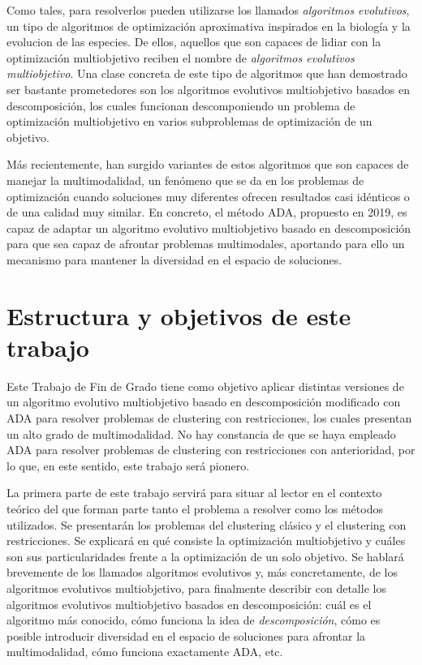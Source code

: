Como tales, para resolverlos pueden utilizarse los llamados \emph{algoritmos evolutivos}, un tipo de algoritmos de optimización aproximativa inspirados en la biología y la evolucion de las especies. De ellos, aquellos que son capaces de lidiar con la optimización multiobjetivo reciben el nombre de \emph{algoritmos evolutivos multiobjetivo}. Una clase concreta de este tipo de algoritmos que han demostrado ser bastante prometedores son los algoritmos evolutivos multiobjetivo basados en descomposición, los cuales funcionan descomponiendo un problema de optimización multiobjetivo en varios subproblemas de optimización de un objetivo.

Más recientemente, han surgido variantes de estos algoritmos que son capaces de manejar la multimodalidad, un fenómeno que se da en los problemas de optimización cuando soluciones muy diferentes ofrecen resultados casi idénticos o de una calidad muy similar. En concreto, el método ADA, propuesto en 2019, es capaz de adaptar un algoritmo evolutivo multiobjetivo basado en descomposición para que sea capaz de afrontar problemas multimodales, aportando para ello un mecanismo para mantener la diversidad en el espacio de soluciones.

\section{Estructura y objetivos de este trabajo}

Este Trabajo de Fin de Grado tiene como objetivo aplicar distintas versiones de un algoritmo evolutivo multiobjetivo basado en descomposición modificado con ADA para resolver problemas de clustering con restricciones, los cuales presentan un alto grado de multimodalidad. No hay constancia de que se haya empleado ADA para resolver problemas de clustering con restricciones con anterioridad, por lo que, en este sentido, este trabajo será pionero.

La primera parte de este trabajo servirá para situar al lector en el contexto teórico del que forman parte tanto el problema a resolver como los métodos utilizados. Se presentarán los problemas del clustering clásico y el clustering con restricciones. Se explicará en qué consiste la optimización multiobjetivo y cuáles son sus particularidades frente a la optimización de un solo objetivo. Se hablará brevemente de los llamados algoritmos evolutivos y, más concretamente, de los algoritmos evolutivos multiobjetivo, para finalmente describir con detalle los algoritmos evolutivos multiobjetivo basados en descomposición: cuál es el algoritmo más conocido, cómo funciona la idea de \emph{descomposición}, cómo es posible introducir diversidad en el espacio de soluciones para afrontar la multimodalidad, cómo funciona exactamente ADA, etc.

